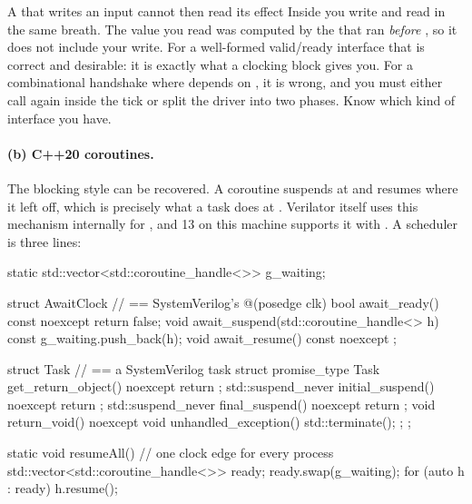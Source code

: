 \begin{gotcha}{A  that writes an input cannot then read its effect}
Inside  you write  and read
 in the same breath. The value you read was computed by the
 that ran \emph{before} , so it does not include
your write. For a well-formed valid/ready interface that is correct and
desirable: it is exactly what a clocking block gives you. For a combinational
handshake where  depends on , it is wrong, and you must
either call  again inside the tick or split the driver into two
phases. Know which kind of interface you have.
\end{gotcha}

\paragraph{(b) C++20 coroutines.} The blocking style can be recovered. A
coroutine suspends at  and resumes where it left off, which is
precisely what a \SV{} task does at . Verilator itself
uses this mechanism internally for , and  13 on this
machine supports it with . A scheduler is three
lines:

\begin{cppcode}[caption={A three-line cooperative scheduler},label={lst:verilator:coro}]
static std::vector<std::coroutine_handle<>> g_waiting;

struct AwaitClock {                    // == SystemVerilog's @(posedge clk)
    bool await_ready() const noexcept { return false; }
    void await_suspend(std::coroutine_handle<> h) const {
        g_waiting.push_back(h);
    }
    void await_resume() const noexcept {}
};

struct Task {                          // == a SystemVerilog task
    struct promise_type {
        Task get_return_object() noexcept { return {}; }
        std::suspend_never initial_suspend() noexcept { return {}; }
        std::suspend_never final_suspend() noexcept { return {}; }
        void return_void() noexcept {}
        void unhandled_exception() { std::terminate(); }
    };
};

static void resumeAll() {              // one clock edge for every process
    std::vector<std::coroutine_handle<>> ready;
    ready.swap(g_waiting);
    for (auto h : ready) h.resume();
}
\end{cppcode}

